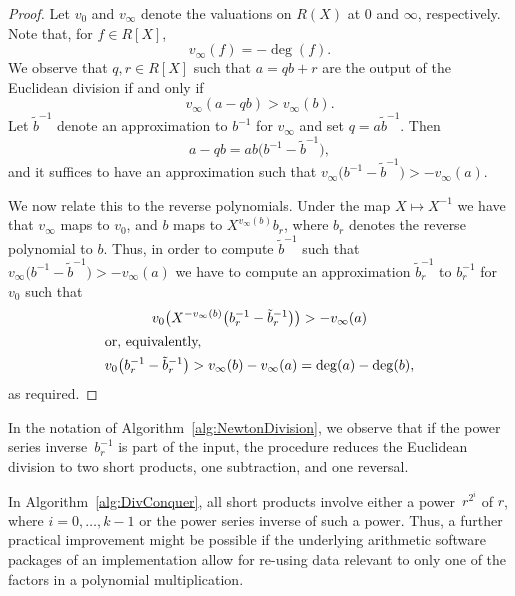 \begin{proof}
Let $v_0$ and $v_{\infty}$ denote the valuations on $R(X)$ at 
$0$ and $\infty$, respectively.  Note that, for $f \in R[X]$, 
\begin{equation*}
v_{\infty}(f) = - \deg(f).
\end{equation*}
We observe that $q, r \in R[X]$ such that $a = qb + r$ are 
the output of the Euclidean division if and only if 
\begin{equation*}
v_{\infty} (a - qb) > v_{\infty} (b).
\end{equation*}
Let $\tilde{b}^{-1}$ denote an approximation to $b^{-1}$ 
for $v_{\infty}$ and set $q = a \tilde{b}^{-1}$.  Then 
\begin{equation*}
a - qb = ab \bigl(b^{-1} - \tilde{b}^{-1}\bigr),
\end{equation*}
and it suffices to have an approximation such that 
\mbox{$v_{\infty} \bigl( b^{-1} - \tilde{b}^{-1} \bigr) > - v_{\infty}(a)$}.

We now relate this to the reverse polynomials.  Under the map 
$X \mapsto X^{-1}$ we have that $v_{\infty}$ maps to $v_0$, 
and $b$ maps to $X^{v_{\infty}(b)} b_r$, where $b_r$ denotes 
the reverse polynomial to $b$.  Thus, in order to compute 
$\tilde{b}^{-1}$ such that 
\mbox{$v_{\infty} \bigl( b^{-1} - \tilde{b}^{-1} \bigr) > - v_{\infty}(a)$} 
we have to compute an approximation $\tilde{b}_r^{-1}$ to 
$b_r^{-1}$ for $v_0$ such that 
\begin{gather*}
v_0 \bigl( X^{-v_{\infty}(b)} \bigl(b_r^{-1} - \tilde{b}_r^{-1} \bigr) \bigr) > - v_{\infty} (a) \\
\intertext{or, equivalently, }
v_0 \bigl(b_r^{-1} - \tilde{b}_r^{-1}\bigr) > v_{\infty}(b) - v_{\infty}(a) = \deg(a) - \deg(b), 
\end{gather*}
as required.
\end{proof}

\begin{rem}
In the notation of Algorithm~\ref{alg:NewtonDivision}, we observe 
that if the power series inverse~$b_r^{-1}$ is part of the input, 
the procedure reduces the Euclidean division to two short products, 
one subtraction, and one reversal.
\end{rem}

\begin{rem}
In Algorithm~\ref{alg:DivConquer}, all short products involve either 
a power~$r^{2^i}$ of $r$, where $i = 0, \dotsc, k-1$ or the power series 
inverse of such a power.  Thus, a further practical improvement might 
be possible if the underlying arithmetic software packages of an 
implementation allow for re-using data relevant to only one of the 
factors in a polynomial multiplication.
\end{rem}

